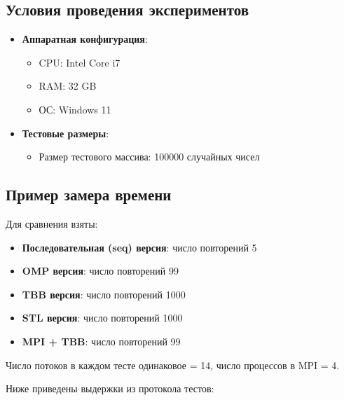 \documentclass[a4paper,12pt]{article}
\begin{document}
\subsection{Условия проведения экспериментов}

\begin{itemize}
    \item \textbf{Аппаратная конфигурация}: 
    \begin{itemize}
        \item CPU: Intel Core i7
        \item RAM: 32 GB
        \item ОС: Windows 11
    \end{itemize}
    \item \textbf{Тестовые размеры}: 
    \begin{itemize}
        \item Размер тестового массива: 100000 случайных чисел
    \end{itemize}
\end{itemize}

\subsection{Пример замера времени}
Для сравнения взяты:
\begin{itemize}
    \item \textbf{Последовательная (seq) версия}: число повторений 5
    \item \textbf{OMP версия}: число повторений 99
    \item \textbf{TBB версия}: число повторений 1000
    \item \textbf{STL версия}: число повторений 1000
    \item \textbf{MPI + TBB}: число повторений 99
\end{itemize}

Число потоков в каждом тесте одинаковое = 14, число процессов в MPI = 4.

Ниже приведены выдержки из протокола тестов:
\end{document}
